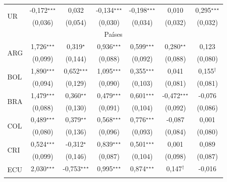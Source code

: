 \documentclass[a4paper]{tufte-handout}
\begin{document}
\begin{table}[h]
\begin{tabular}{l c c c c c c}
    \multirow{2}{*}{UR} & -0,172$^\star$$^\star$$^\star$ & 0,032 & -0,134$^\star$$^\star$$^\star$ & -0,198$^\star$$^\star$$^\star$ & 0,010 & 0,295$^\star$$^\star$$^\star$ \\
    & {\scriptsize (0,036)} & {\scriptsize (0,054)} & {\scriptsize (0,030)} & {\scriptsize (0,034)} & {\scriptsize (0,032)} & {\scriptsize (0,032)} \\ \midrule    
    \multicolumn{7}{c}{Países} \\ \midrule
    \multirow{2}{*}{ARG} & 1,726$^\star$$^\star$$^\star$ & 0,319$^\star$ & 0,936$^\star$$^\star$$^\star$ & 0,599$^\star$$^\star$$^\star$ & 0,280$^\star$$^\star$ & 0,123 \\
    & {\scriptsize (0,099)} & {\scriptsize (0,144)} & {\scriptsize (0,088)} & {\scriptsize (0,092)} & {\scriptsize (0,088)} & {\scriptsize (0,080)} \\
    \multirow{2}{*}{BOL} & 1,890$^\star$$^\star$$^\star$ & 0,652$^\star$$^\star$$^\star$ & 1,095$^\star$$^\star$$^\star$ & 0,355$^\star$$^\star$$^\star$ & 0,041 & 0,155$^\dagger$ \\
    & {\scriptsize (0,094)} & {\scriptsize (0,129)} & {\scriptsize (0,090)} & {\scriptsize (0,103)} & {\scriptsize (0,081)} & {\scriptsize (0,081)} \\
    \multirow{2}{*}{BRA} & 1,479$^\star$$^\star$$^\star$ & 0,360$^\star$$^\star$ & 0,479$^\star$$^\star$$^\star$ & 0,601$^\star$$^\star$$^\star$ & -0,472$^\star$$^\star$$^\star$ & -0,076 \\
    & {\scriptsize (0,088)} & {\scriptsize (0,130)} & {\scriptsize (0,091)} & {\scriptsize (0,104)} & {\scriptsize (0,092)} & {\scriptsize (0,086)} \\
    \multirow{2}{*}{COL} & 0,489$^\star$$^\star$$^\star$ & 0,379$^\star$$^\star$ & 0,568$^\star$$^\star$$^\star$ & 0,776$^\star$$^\star$$^\star$ & -0,087 & 0,001 \\
    & {\scriptsize (0,080)} & {\scriptsize (0,136)} & {\scriptsize (0,096)} & {\scriptsize (0,093)} & {\scriptsize (0,084)} & {\scriptsize (0,080)} \\
    \multirow{2}{*}{CRI} & 0,524$^\star$$^\star$$^\star$ & -0,312$^\star$ & 0,839$^\star$$^\star$$^\star$ & 0,501$^\star$$^\star$$^\star$ & 0,001 & 0,089 \\
    & {\scriptsize (0,099)} & {\scriptsize (0,146)} & {\scriptsize (0,087)} & {\scriptsize (0,104)} & {\scriptsize (0,098)} & {\scriptsize (0,087)} \\
    \multirow{2}{*}{ECU} & 2,030$^\star$$^\star$$^\star$ & -0,753$^\star$$^\star$$^\star$ & 0,995$^\star$$^\star$$^\star$ & 0,874$^\star$$^\star$$^\star$ & 0,147$^\dagger$ & -0,016 \\
$$
\end{tabular}
\end{table}
\end{document}
